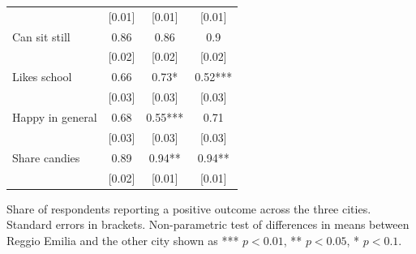 \documentclass[12pt]{article}
\begin{document}
\begin{table}[ht]
\begin{center}
\begin{tabular}{lccc}
          & [0.01] & [0.01] & [0.01] \\
    Can sit still & 0.86  & 0.86  & 0.9 \\
          & [0.02] & [0.02] & [0.02] \\
    Likes school & 0.66  & 0.73* & 0.52*** \\
          & [0.03] & [0.03] & [0.03] \\
    Happy in general & 0.68  & 0.55*** & 0.71 \\
          & [0.03] & [0.03] & [0.03] \\
    Share candies & 0.89  & 0.94** & 0.94** \\
          & [0.02] & [0.01] & [0.01] \\


    \hline	
    \end{tabular}
\end{center}

\begin{footnotesize}
\raggedright{Share of respondents reporting a positive outcome across the three cities. Standard errors in brackets.
Non-parametric test of differences in means between Reggio Emilia and the other city shown as *** $p<0.01$, ** $p<0.05$, * $p<0.1$.}
\end{footnotesize}
\end{table}
\end{document}
